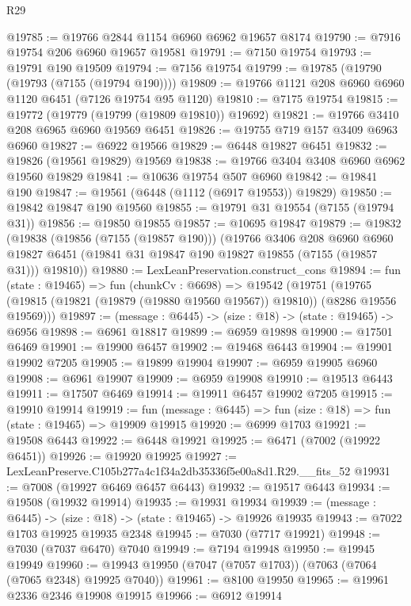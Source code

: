 \begin{lexlean}{R29}
\begin{coremodule}
@19785 := @19766 @2844 @1154 @6960 @6962 @19657 @8174
@19790 := @7916 @19754 @206 @6960 @19657 @19581
@19791 := @7150 @19754
@19793 := @19791 @190 @19509
@19794 := @7156 @19754
@19799 := @19785 (@19790 (@19793 (@7155 (@19794 @190))))
@19809 := @19766 @1121 @208 @6960 @6960 @1120 @6451 (@7126 @19754 @95 @1120)
@19810 := @7175 @19754
@19815 := @19772 (@19779 (@19799 (@19809 @19810)) @19692)
@19821 := @19766 @3410 @208 @6965 @6960 @19569 @6451
@19826 := @19755 @719 @157 @3409 @6963 @6960
@19827 := @6922 @19566
@19829 := @6448 @19827 @6451
@19832 := @19826 (@19561 @19829) @19569
@19838 := @19766 @3404 @3408 @6960 @6962 @19560 @19829
@19841 := @10636 @19754 @507 @6960
@19842 := @19841 @190
@19847 := @19561 (@6448 (@1112 (@6917 @19553)) @19829)
@19850 := @19842 @19847 @190 @19560
@19855 := @19791 @31 @19554 (@7155 (@19794 @31))
@19856 := @19850 @19855
@19857 := @10695 @19847
@19879 := @19832
    (@19838
      (@19856 (@7155 (@19857 @190)))
      (@19766
        @3406
        @208
        @6960
        @6960
        @19827
        @6451
        (@19841 @31 @19847 @190 @19827 @19855 (@7155 (@19857 @31)))
        @19810))
@19880 := LexLeanPreservation.construct_cons
@19894 := fun (state : @19465) =>
  fun (chunkCv : @6698) =>
  @19542
    (@19751 (@19765 (@19815 (@19821 (@19879 (@19880 @19560 @19567)) @19810)) (@8286 @19556 @19569)))
@19897 := (message : @6445) -> (size : @18) -> (state : @19465) -> @6956
@19898 := @6961 @18817
@19899 := @6959 @19898
@19900 := @17501 @6469
@19901 := @19900 @6457
@19902 := @19468 @6443
@19904 := @19901 @19902 @7205
@19905 := @19899 @19904
@19907 := @6959 @19905 @6960
@19908 := @6961 @19907
@19909 := @6959 @19908
@19910 := @19513 @6443
@19911 := @17507 @6469
@19914 := @19911 @6457 @19902 @7205
@19915 := @19910 @19914
@19919 := fun (message : @6445) => fun (size : @18) => fun (state : @19465) => @19909 @19915
@19920 := @6999 @1703
@19921 := @19508 @6443
@19922 := @6448 @19921
@19925 := @6471 (@7002 (@19922 @6451))
@19926 := @19920 @19925
@19927 := LexLeanPreserve.C105b277a4c1f34a2db35336f5e00a8d1.R29.__fits_52
@19931 := @7008 (@19927 @6469 @6457 @6443)
@19932 := @19517 @6443
@19934 := @19508 (@19932 @19914)
@19935 := @19931 @19934
@19939 := (message : @6445) -> (size : @18) -> (state : @19465) -> @19926 @19935
@19943 := @7022 @1703 @19925 @19935 @2348
@19945 := @7030 (@7717 @19921)
@19948 := @7030 (@7037 @6470) @7040
@19949 := @7194 @19948
@19950 := @19945 @19949
@19960 := @19943 @19950 (@7047 (@7057 @1703)) (@7063 (@7064 (@7065 @2348) @19925 @7040))
@19961 := @8100 @19950
@19965 := @19961 @2336 @2346 @19908 @19915
@19966 := @6912 @19914

\end{coremodule}
\end{lexlean}
